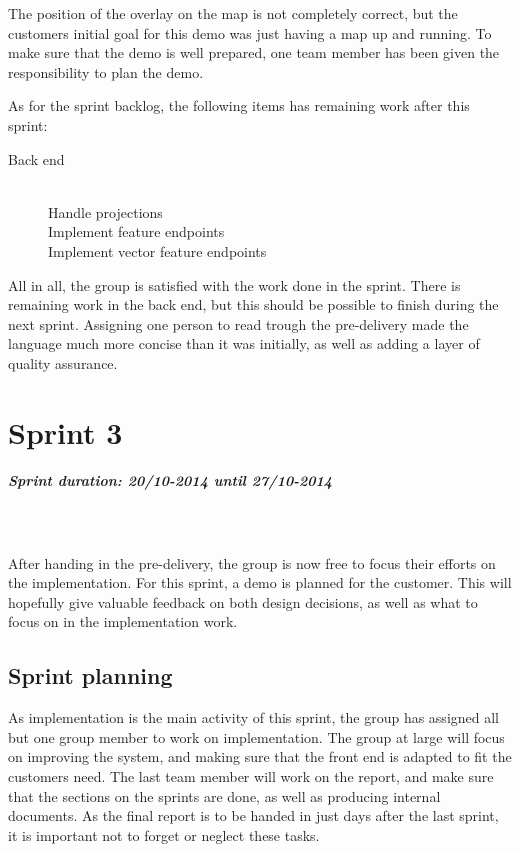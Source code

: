 \documentclass[11pt,a4paper,titlepage,oneside]{report}
\begin{document}
The position of the overlay on the map is not completely correct, but the customers initial goal for this demo was just having a map up and running. To make sure that the demo is well prepared, one team member has been given the responsibility to plan the demo. 

As for the sprint backlog, the following items has remaining work after this sprint:

\begin{description}
	\item[Back end] \hfill \\
	Handle projections \hfill \\
	Implement feature endpoints \hfill \\
	Implement vector feature endpoints
\end{description}

All in all, the group is satisfied with the work done in the sprint. There is remaining work in the back end, but this should be possible to finish during the next sprint. Assigning one person to read trough the pre-delivery made the language much more concise than it was initially, as well as adding a layer of quality assurance. 



\chapter{Sprint 3}
\paragraph{Sprint duration: 20/10-2014 until 27/10-2014} \hfill \\
\\
\noindent
After handing in the pre-delivery, the group is now free to focus their efforts on the implementation. For this sprint, a demo is planned for the customer. This will hopefully give valuable feedback on both design decisions, as well as what to focus on in the implementation work.

\section{Sprint planning}
As implementation is the main activity of this sprint, the group has assigned all but one group member to work on implementation. The group at large will focus on improving the system, and making sure that the front end is adapted to fit the customers need. The last team member will work on the report, and make sure that the sections on the sprints are done, as well as producing internal documents. As the final report is to be handed in just days after the last sprint, it is important not to forget or neglect these tasks. 
\end{document}
